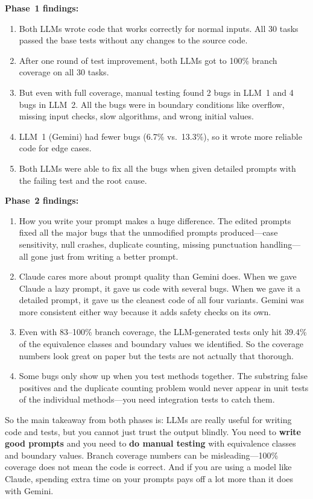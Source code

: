\documentclass[12pt, a4paper]{article}
\begin{document}
\textbf{Phase~1 findings:}
\begin{enumerate}
    \item Both LLMs wrote code that works correctly for normal inputs. All 30 tasks passed the base tests without any changes to the source code.
    \item After one round of test improvement, both LLMs got to 100\% branch coverage on all 30 tasks.
    \item But even with full coverage, manual testing found 2 bugs in LLM~1 and 4 bugs in LLM~2. All the bugs were in boundary conditions like overflow, missing input checks, slow algorithms, and wrong initial values.
    \item LLM~1 (Gemini) had fewer bugs (6.7\% vs.\ 13.3\%), so it wrote more reliable code for edge cases.
    \item Both LLMs were able to fix all the bugs when given detailed prompts with the failing test and the root cause.
\end{enumerate}

\textbf{Phase~2 findings:}
\begin{enumerate}
    \item How you write your prompt makes a huge difference. The edited prompts fixed all the major bugs that the unmodified prompts produced---case sensitivity, null crashes, duplicate counting, missing punctuation handling---all gone just from writing a better prompt.
    \item Claude cares more about prompt quality than Gemini does. When we gave Claude a lazy prompt, it gave us code with several bugs. When we gave it a detailed prompt, it gave us the cleanest code of all four variants. Gemini was more consistent either way because it adds safety checks on its own.
    \item Even with 83--100\% branch coverage, the LLM-generated tests only hit 39.4\% of the equivalence classes and boundary values we identified. So the coverage numbers look great on paper but the tests are not actually that thorough.
    \item Some bugs only show up when you test methods together. The substring false positives and the duplicate counting problem would never appear in unit tests of the individual methods---you need integration tests to catch them.
\end{enumerate}

So the main takeaway from both phases is: LLMs are really useful for writing code and tests, but you cannot just trust the output blindly. You need to \textbf{write good prompts} and you need to \textbf{do manual testing} with equivalence classes and boundary values. Branch coverage numbers can be misleading---100\% coverage does not mean the code is correct. And if you are using a model like Claude, spending extra time on your prompts pays off a lot more than it does with Gemini.
\end{document}
